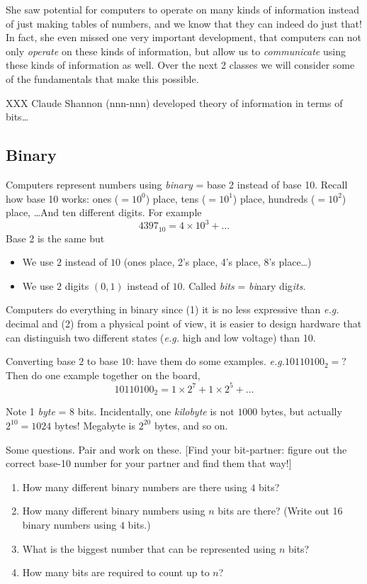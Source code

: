 \documentclass{article}
\newcommand{\eg}{\emph{e.g.}\xspace}
\begin{document}
She saw potential for computers to operate on many kinds of
information instead of just making tables of numbers, and we know that
they can indeed do just that!  In fact, she even missed one very
important development, that computers can not only \emph{operate} on
these kinds of information, but allow us to \emph{communicate} using
these kinds of information as well.  Over the next 2 classes we will
consider some of the fundamentals that make this possible.

XXX Claude Shannon (nnn-nnn) developed theory of information in terms
of bits\dots

\subsection*{Binary}

Computers represent numbers using \emph{binary} = base 2 instead of
base 10.  Recall how base 10 works: ones ($=10^0$) place, tens
($=10^1$) place, hundreds ($=10^2$) place, \dots  And ten different
digits.  For example \[ 4397_{10} = 4 \times 10^3 + \dots \] Base 2 is
the same but
\begin{itemize}
\item We use $2$ instead of $10$ (ones place, 2's place, 4's place,
  8's place\dots)
\item We use $2$ digits $(0,1)$ instead of $10$.  Called \emph{bits} =
  \emph{bi}nary dig\emph{its}.
\end{itemize}
Computers do everything in binary since (1) it is no less expressive
than \eg decimal and (2) from a physical point of view, it is easier
to design hardware that can distinguish two different states
(\eg high and low voltage) than 10.

Converting base $2$ to base $10$: have them do some
examples. \eg $10110100_2 = ?$  Then do one example together on the
board, \[ 10110100_2 = 1 \times 2^7 + 1 \times 2^5 + \dots \]

Note 1 \emph{byte} = 8 bits.  Incidentally, one \emph{kilobyte} is not
$1000$ bytes, but actually $2^{10} = 1024$ bytes!  Megabyte is
$2^{20}$ bytes, and so on.

Some questions.  Pair and work on these. [Find your bit-partner:
figure out the correct base-10 number for your partner and find them
that way!]

\begin{enumerate}
\item How many different binary numbers are there using $4$ bits?
\item How many different binary numbers using $n$ bits are there?
  (Write out 16 binary numbers using $4$ bits.)
\item What is the biggest number that can be represented using $n$
  bits?
\item How many bits are required to count up to $n$?
\end{enumerate}
\end{document}
